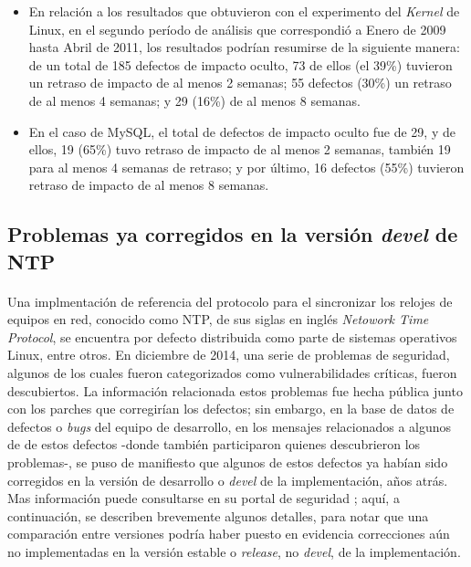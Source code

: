 \documentclass[11pt,a4paper]{article}
\begin{document}
\begin{itemize}

\item En relación a los resultados que obtuvieron con el experimento del \textit{Kernel} de Linux, en el segundo período de análisis que correspondió a Enero de 2009 hasta Abril de 2011, los resultados podrían resumirse de la siguiente manera: de un total de 185 defectos de impacto oculto, 73 de ellos (el 39\%) tuvieron un retraso de impacto de al menos 2 semanas; 55 defectos (30\%) un retraso de al menos 4 semanas; y 29 (16\%) de al menos 8 semanas.

\item En el caso de MySQL, el total de defectos de impacto oculto fue de 29, y de ellos, 19 (65\%) tuvo retraso de impacto de al menos 2 semanas, también 19 para al menos 4 semanas de retraso; y por último, 16 defectos (55\%) tuvieron retraso de impacto de al menos 8 semanas.

\end{itemize}

\subsection{Problemas ya corregidos en la versión \textit{devel} de NTP}

\paragraph{}Una implmentación de referencia del protocolo para el sincronizar los relojes de equipos en red, conocido como NTP, de sus siglas en inglés \textit{Netowork Time Protocol}, se encuentra por defecto distribuida como parte de sistemas operativos Linux, entre otros. En diciembre de 2014, una serie de problemas de seguridad, algunos de los cuales fueron categorizados como vulnerabilidades críticas, fueron descubiertos. La información relacionada estos problemas fue hecha pública junto con los parches que corregirían los defectos; sin embargo, en la base de datos de defectos o \textit{bugs} del equipo de desarrollo, en los mensajes relacionados a algunos de de estos defectos -donde también participaron quienes descubrieron los problemas-, se puso de manifiesto que algunos de estos defectos ya habían sido corregidos en la versión de desarrollo o \textit{devel} de la implementación, años atrás. Mas información puede consultarse en su portal de seguridad \cite{ntpSecNot}; aquí, a continuación, se describen brevemente algunos detalles, para notar que una comparación entre versiones podría haber puesto en evidencia correcciones aún no implementadas en la versión estable o \textit{release}, no \textit{devel}, de la implementación. 
\\
\end{document}
